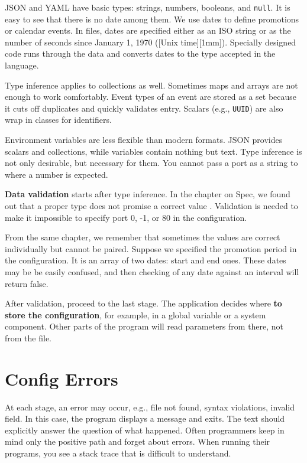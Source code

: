 
JSON and YAML have basic types: strings, numbers, booleans, and \verb|null|. It is easy to see that there is no date among them. We use dates to define promotions or calendar events. In files, dates are specified either as an ISO string or as the number of seconds since January 1, 1970 ([Unix time][1mm]). Specially designed code runs through the data and converts dates to the type accepted in the language.

Type inference applies to collections as well. Sometimes maps and arrays are not enough to work comfortably. Event types of an event are stored as a set because it cuts off duplicates and quickly validates entry. Scalars (e.g., \verb|UUID|) are also wrap in classes for identifiers.

Environment variables are less flexible than modern formats. JSON provides scalars and collections, while variables contain nothing but text. Type inference is not only desirable, but necessary for them. You cannot pass a port as a string to where a number is expected.


\textbf{Data validation} starts after type inference. In the chapter on Spec, we found out that a proper type does not promise a correct value . Validation is needed to make it impossible to specify port 0, -1, or 80 in the configuration.

From the same chapter, we remember that sometimes the values are correct individually but cannot be paired. Suppose we specified the promotion period in the configuration. It is an array of two dates: start and end ones. These dates may be be easily confused, and then checking of any date against an interval will return false.

After validation, proceed to the last stage. The application decides where \textbf{to store the configuration}, for example, in a global variable or a system component. Other parts of the program will read parameters from there, not from the file.

\section{Config Errors}


At each stage, an error may occur, e.g., file not found, syntax violations, invalid field. In this case, the program displays a message and exits. The text should explicitly answer the question of what happened. Often programmers keep in mind only the positive path and forget about errors. When running their programs, you see a stack trace that is difficult to understand.

